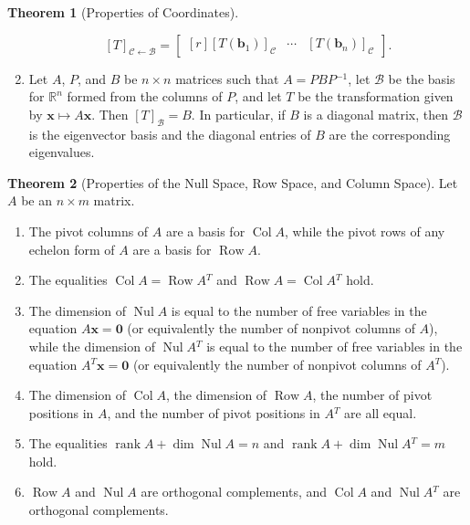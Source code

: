 \documentclass{myart}
\renewcommand{\vec}[1]{\ensuremath{\mathbf{#1}}} %
\newcommand{\mat}[1]{\ensuremath{#1}} %
\newcommand{\R}[1][]{\ensuremath{\mathbb{R}^{#1}}} %
\newcommand{\by}{\ensuremath{\times}} %
\newcommand{\MAT}[2][r]{\ensuremath{\begin{bmatrix*}[#1]#2\end{bmatrix*}}} %
\newcommand{\inv}{\ensuremath{^{-1}}} %
\newcommand{\trans}{\ensuremath{^T}} %
\DeclareMathOperator{\Nul}{Nul} %
\DeclareMathOperator{\Col}{Col} %
\DeclareMathOperator{\Row}{Row} %
\newcommand{\basis}[1]{\ensuremath{\mathcal{#1}}} %
\DeclareMathOperator{\rank}{rank} %
\newcommand{\from}{\leftarrow} %
\newcommand{\coord}[2]{\ensuremath{\left[#1\right]_{#2}}} %
\newcommand{\transmat}[2]{\coord{#1}{#2}} %
\newcommand{\transmatb}[3]{\coord{#1}{#2 \from #3}} %
\theoremstyle{definition}
\newtheorem{thm}{Theorem}
\begin{document}
\begin{thm}[Properties of Coordinates]
\begin{enumerate}
\begin{equation*}
\transmatb{T}{\basis C}{\basis B} = \MAT{\coord{T(\vec b_1)}{\basis C} & \cdots & \coord{T(\vec b_n)}{\basis C}}.
\end{equation*}
\item Let \mat A, \mat P, and \mat B be $n \by n$ matrices such that $\mat A = \mat P\mat B\mat P\inv$, let \basis B be the basis for \R[n] formed from the columns of \mat P, and let $T$ be the transformation given by $\vec x \mapsto \mat A\vec x$. Then $\transmat{T}{\basis B} = \mat B$. In particular, if \mat B is a diagonal matrix, then \basis B is the eigenvector basis and the diagonal entries of \mat B are the corresponding eigenvalues.
\end{enumerate}
\end{thm}

\begin{thm}[Properties of the Null Space, Row Space, and Column Space]
Let \mat A be an $n \by m$ matrix.
\begin{enumerate}
\item The pivot columns of \mat A are a basis for $\Col \mat A$, while the pivot rows of any echelon form of \mat A are a basis for $\Row \mat A$.
\item The equalities $\Col \mat A = \Row \mat A\trans$ and $\Row \mat A = \Col \mat A\trans$ hold.
\item The dimension of $\Nul \mat A$ is equal to the number of free variables in the equation $\mat A\vec x = \vec 0$ (or equivalently the number of nonpivot columns of \mat A), while the dimension of $\Nul \mat A\trans$ is equal to the number of free variables in the equation $\mat A\trans\vec x = \vec 0$ (or equivalently the number of nonpivot columns of \mat A\trans).
\item The dimension of $\Col \mat A$, the dimension of $\Row \mat A$, the number of pivot positions in \mat A, and the number of pivot positions in $\mat A\trans$ are all equal.
\item The equalities $\rank \mat A + \dim \Nul \mat A = n$ and $\rank \mat A + \dim \Nul \mat A\trans = m$ hold.
\item $\Row \mat A$ and $\Nul \mat A$ are orthogonal complements, and $\Col \mat A$ and $\Nul \mat A\trans$ are orthogonal complements.
\end{enumerate}
\end{thm}
\end{document}
